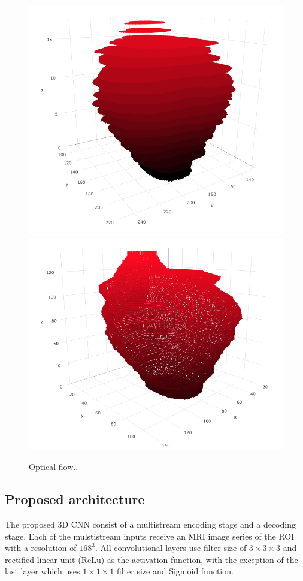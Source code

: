 \begin{figure}[h]
    \centering
    \includegraphics[totalheight=.15\textheight]{imgs/methodology/OF_1.png}
    \includegraphics[totalheight=.15\textheight]{imgs/methodology/OF_2.png}
    \caption{Optical flow..}
    \label{fig:of1}
\end{figure}

\subsection{Proposed architecture}
The proposed 3D CNN consist of a multistream encoding stage and a decoding stage. Each
of the mulstistream inputs receive an MRI image series of the ROI with a resolution of
$168^3$. All convolutional layers use filter size of $3 \times 3 \times 3$ and
rectified linear unit (ReLu) as the activation function, with the exception
of the last layer which uses  $1 \times 1 \times 1$ filter size and Sigmoid function. 

